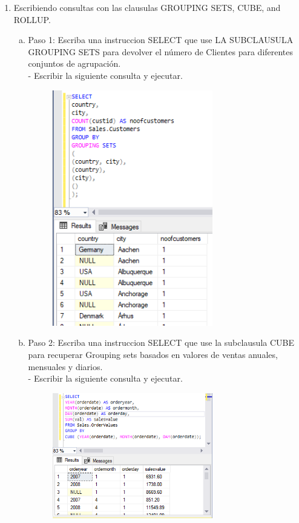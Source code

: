 \begin{enumerate}[1.]
	\item Escribiendo consultas con las clausulas GROUPING SETS, CUBE, and ROLLUP.
	\begin{enumerate}[a)]
	\item Paso 1: Escriba una instruccion SELECT que use LA SUBCLAUSULA GROUPING SETS para devolver el número de
Clientes para diferentes conjuntos de agrupación.\\
		-  Escribir la siguiente consulta y ejecutar. 
		\begin{figure}[H]
		\begin{center}
		\includegraphics[width=7cm]{./Imagenes/e3-1}
		\end{center}
		\end{figure}
	\item Paso 2: Escriba una instruccion SELECT que use la subclausula CUBE para recuperar Grouping sets basados en valores de ventas anuales, mensuales y diarios.\\
		-  Escribir la siguiente consulta y ejecutar. 
		\begin{figure}[H]
		\begin{center}
		\includegraphics[width=7cm]{./Imagenes/e3-2}

\end{center}
\end{figure}
\end{enumerate}
\end{enumerate}
